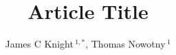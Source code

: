 \documentclass[utf8]{frontiersSCNS} %
\def\firstAuthorLast{Knight and Nowotny} %
\def\Authors{James C Knight\,$^{1,*}$, Thomas Nowotny\,$^{1}$}
\begin{document}
\onecolumn
{}

\title[Running Title]{Article Title} 

\author[\firstAuthorLast ]{\Authors} %
\address{} %
\correspondance{} %

\extraAuth{}%


\maketitle
\end{document}
